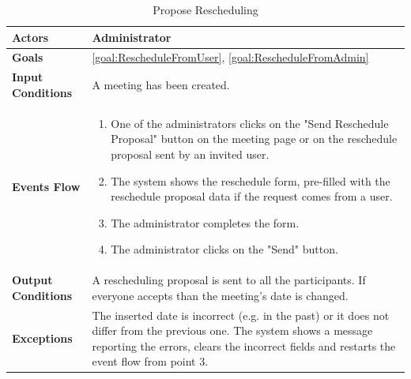 \begin{table}[H]
	\centering
	\def\arraystretch{1.5}
	\begin{tabular}{|p{7cm}|p{7cm}|}
		\hline
		\textbf{Actors}           & Administrator    \\ \hline
		\textbf{Goals}            & \ref{goal:RescheduleFromUser}, \ref{goal:RescheduleFromAdmin}           \\ \hline
		{\textbf{Input Conditions}}  & A meeting has been created.           \\ \hline
		{\textbf{Events Flow}}       &
		\begin{enumerate}[topsep=0pt, leftmargin=*]					
			\item One of the administrators clicks on the "Send Reschedule Proposal" button on the meeting page or on the reschedule proposal sent by an invited user.
			\item The system shows the reschedule form, pre-filled with the reschedule proposal data if the request comes from a user.
			\item The administrator completes the form.
			\item The administrator clicks on the "Send" button.
		\end{enumerate}                         \\ \hline
		\textbf{Output Conditions} & A rescheduling proposal is sent to all the participants. If everyone accepts than the meeting's date is changed.         \\ \hline
		\textbf{Exceptions}        & The inserted date is incorrect (e.g. in the past) or it does not differ from the previous one. The system shows a message reporting the errors, clears the incorrect fields and restarts the event flow from point 3.  \\ \hline
	\end{tabular}
	\caption{Propose Rescheduling}
\end{table}